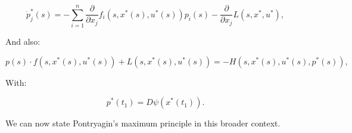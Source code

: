 \begin{equation}\label{4-3-pontrydotp}
    \dot{p}_j^{\ast}(s) =  - \sum_{i=1}^n \frac{\partial}{\partial x_{j}}f_i(s,x^{\ast}(s),u^{\ast}(s))p_i(s) - \frac{\partial}{\partial x_{j}} L(s,x^{\ast},u^{\ast})  ,
\end{equation}

And also:

\begin{equation}\label{4-3-pontry-maxH}
    p(s)\cdot f(s,x^{\ast}(s),u^{\ast}(s)) + L(s,x^{\ast}(s),u^{\ast}(s)) = -H(s,x^{\ast}(s),u^{\ast}(s),p^{\ast}(s)),
\end{equation}

With:

\begin{equation}\label{4-3-pontry-trans}
    p^{\ast}(t_1) = D \psi(x^{\ast}(t_1)).
\end{equation}

We can now state Pontryagin's maximum principle in this broader context.

